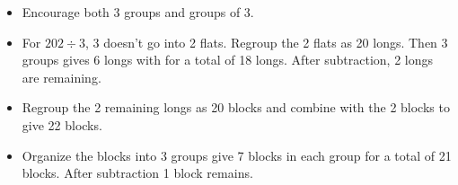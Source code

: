 \documentclass[nooutcomes]{ximera}
\begin{document}
\begin{teachingnote}
\begin{itemize}
\item Encourage both 3 groups and groups of 3.  
\item For $202\div 3$, 3 doesn't go into 2 flats.  Regroup the 2 flats as 20 longs.  Then 3 groups gives 6 longs with for a total of 18 longs.  After subtraction, 2 longs are remaining. 
\item Regroup the 2 remaining longs as 20 blocks and combine with the 2 blocks to give 22 blocks.  
\item Organize the blocks into 3 groups give 7 blocks in each group for a total of 21 blocks.  After subtraction 1 block remains.  
\end{itemize}
\end{teachingnote}
\end{document}
